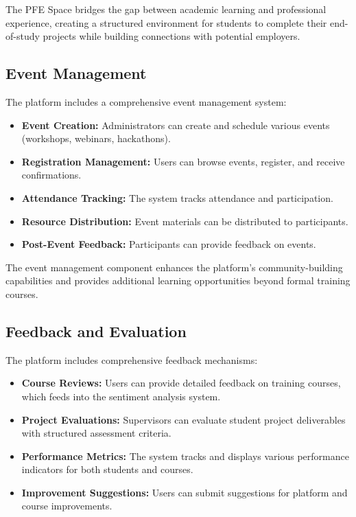 \documentclass[12pt,a4paper]{report}
\begin{document}
The PFE Space bridges the gap between academic learning and professional experience, creating a structured environment for students to complete their end-of-study projects while building connections with potential employers.

\subsection{Event Management}
The platform includes a comprehensive event management system:

\begin{itemize}
    \item \textbf{Event Creation:} Administrators can create and schedule various events (workshops, webinars, hackathons).

    \item \textbf{Registration Management:} Users can browse events, register, and receive confirmations.

    \item \textbf{Attendance Tracking:} The system tracks attendance and participation.

    \item \textbf{Resource Distribution:} Event materials can be distributed to participants.

    \item \textbf{Post-Event Feedback:} Participants can provide feedback on events.
\end{itemize}

The event management component enhances the platform's community-building capabilities and provides additional learning opportunities beyond formal training courses.

\subsection{Feedback and Evaluation}
The platform includes comprehensive feedback mechanisms:

\begin{itemize}
    \item \textbf{Course Reviews:} Users can provide detailed feedback on training courses, which feeds into the sentiment analysis system.

    \item \textbf{Project Evaluations:} Supervisors can evaluate student project deliverables with structured assessment criteria.

    \item \textbf{Performance Metrics:} The system tracks and displays various performance indicators for both students and courses.

    \item \textbf{Improvement Suggestions:} Users can submit suggestions for platform and course improvements.
\end{itemize}
\end{document}
